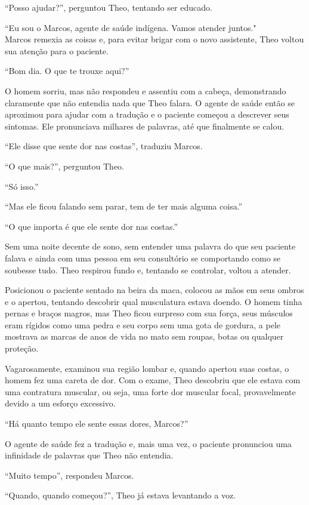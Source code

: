 ``Posso ajudar?'', perguntou Theo, tentando ser educado.

``Eu sou o Marcos, agente de saúde indígena. Vamos atender juntos."\\
Marcos remexia as coisas e, para evitar brigar com o novo assistente,
Theo voltou sua atenção para o paciente.

``Bom dia. O que te trouxe aqui?''

O homem sorriu, mas não respondeu e assentiu com a cabeça, demonstrando
claramente que não entendia nada que Theo falara. O agente de saúde
então se aproximou para ajudar com a tradução e o paciente começou a
descrever seus sintomas. Ele pronunciava milhares de palavras, até que
finalmente se calou.

``Ele disse que sente dor nas costas'', traduziu Marcos.

``O que mais?'', perguntou Theo.

``Só isso.''

``Mas ele ficou falando sem parar, tem de ter mais alguma coisa.''

``O que importa é que ele sente dor nas costas.''

Sem uma noite decente de sono, sem entender uma palavra do que seu
paciente falava e ainda com uma pessoa em seu consultório se comportando
como se soubesse tudo. Theo respirou fundo e, tentando se controlar,
voltou a atender.

Posicionou o paciente sentado na beira da maca, colocou as mãos em seus
ombros e o apertou, tentando descobrir qual musculatura estava doendo. O
homem tinha pernas e braços magros, mas Theo ficou surpreso com sua
força, seus músculos eram rígidos como uma pedra e seu corpo sem uma
gota de gordura, a pele mostrava as marcas de anos de vida no mato sem
roupas, botas ou qualquer proteção.

Vagarosamente, examinou sua região lombar e, quando apertou suas costas,
o homem fez uma careta de dor. Com o exame, Theo descobriu que ele
estava com uma contratura muscular, ou seja, uma forte dor muscular
focal, provavelmente devido a um esforço excessivo.

``Há quanto tempo ele sente essas dores, Marcos?''

O agente de saúde fez a tradução e, mais uma vez, o paciente pronunciou
uma infinidade de palavras que Theo não entendia.

``Muito tempo'', respondeu Marcos.

``Quando, quando começou?'', Theo já estava levantando a voz.

